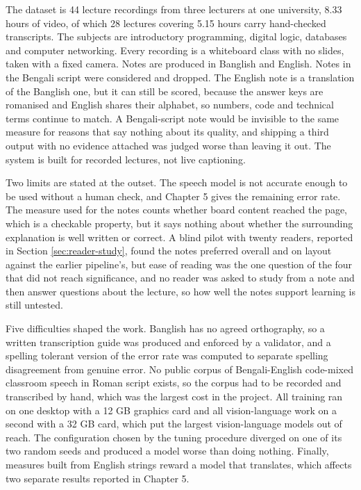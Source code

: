 The dataset is 44 lecture recordings from three lecturers at one university, 8.33 hours
of video, of which 28 lectures covering 5.15 hours carry hand-checked transcripts. The
subjects are introductory programming, digital logic, databases and computer networking.
Every recording is a whiteboard class with no slides, taken with a fixed camera. Notes
are produced in Banglish and English. Notes in the Bengali script were considered and
dropped. The English note is a translation of the Banglish one, but it can still be
scored, because the answer keys are romanised and English shares their alphabet, so
numbers, code and technical terms continue to match. A Bengali-script note would be
invisible to the same measure for reasons that say nothing about its quality, and
shipping a third output with no evidence attached was judged worse than leaving it out. The system is built for recorded lectures, not live captioning.

Two limits are stated at the outset. The speech model is not accurate enough to be used
without a human check, and Chapter 5 gives the remaining error rate. The measure used for
the notes counts whether board content reached the page, which is a checkable property,
but it says nothing about whether the surrounding explanation is well written or correct.
A blind pilot with twenty readers, reported in Section \ref{sec:reader-study}, found the
notes preferred overall and on layout against the earlier pipeline's, but ease of reading
was the one question of the four that did not reach significance, and no reader was asked
to study from a note and then answer questions about the lecture, so how well the notes
support learning is still untested.

Five difficulties shaped the work. Banglish has no agreed orthography, so a written
transcription guide was produced and enforced by a validator, and a spelling tolerant
version of the error rate was computed to separate spelling disagreement from genuine
error. No public corpus of Bengali-English code-mixed classroom speech in Roman script
exists, so the corpus had to be recorded and transcribed by hand, which was the largest
cost in the project. All training ran on one desktop with a 12 GB graphics card and all
vision-language work on a second with a 32 GB card, which put the largest
vision-language models out of reach. The configuration chosen by the tuning procedure
diverged on one of its two random seeds and produced a model worse than doing nothing.
Finally, measures built from English strings reward a model that translates, which
affects two separate results reported in Chapter 5.

